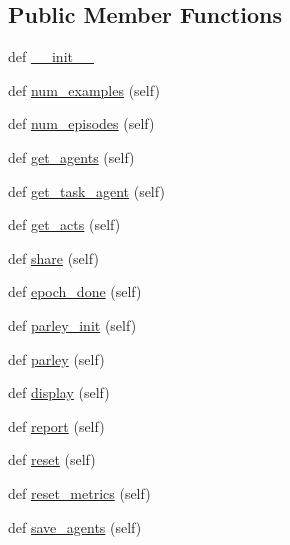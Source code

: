 \subsection*{Public Member Functions}
\begin{DoxyCompactItemize}
\item 
def \hyperlink{classparlai_1_1core_1_1worlds_1_1MultiWorld_aba482213da390b05a216cedb070e28ee}{\+\_\+\+\_\+init\+\_\+\+\_\+}
\item 
def \hyperlink{classparlai_1_1core_1_1worlds_1_1MultiWorld_ae62ad8500e4208ed99ffcf91707746e1}{num\+\_\+examples} (self)
\item 
def \hyperlink{classparlai_1_1core_1_1worlds_1_1MultiWorld_a3efde7408bd94052b0a4880aefbc5d0a}{num\+\_\+episodes} (self)
\item 
def \hyperlink{classparlai_1_1core_1_1worlds_1_1MultiWorld_a6e012b3db760d95f189baf3466fc55d0}{get\+\_\+agents} (self)
\item 
def \hyperlink{classparlai_1_1core_1_1worlds_1_1MultiWorld_a593c1eb833633014c2506abd80695317}{get\+\_\+task\+\_\+agent} (self)
\item 
def \hyperlink{classparlai_1_1core_1_1worlds_1_1MultiWorld_a73074f333544de25b4e07ffc48819896}{get\+\_\+acts} (self)
\item 
def \hyperlink{classparlai_1_1core_1_1worlds_1_1MultiWorld_ae780a8cfd7c6b675727cca24b8321015}{share} (self)
\item 
def \hyperlink{classparlai_1_1core_1_1worlds_1_1MultiWorld_a7034326fa264402e0857a98d1ec688de}{epoch\+\_\+done} (self)
\item 
def \hyperlink{classparlai_1_1core_1_1worlds_1_1MultiWorld_a9f2f4de7791e3b295359039e9d26a523}{parley\+\_\+init} (self)
\item 
def \hyperlink{classparlai_1_1core_1_1worlds_1_1MultiWorld_aae71b8182e17a1579352a52b56614b64}{parley} (self)
\item 
def \hyperlink{classparlai_1_1core_1_1worlds_1_1MultiWorld_a03a162a9c53ed806221e46762d3fcb52}{display} (self)
\item 
def \hyperlink{classparlai_1_1core_1_1worlds_1_1MultiWorld_aa89365baa3672e08d8e239199df4eda7}{report} (self)
\item 
def \hyperlink{classparlai_1_1core_1_1worlds_1_1MultiWorld_afcdadb92455ce41a8156390d876ebb96}{reset} (self)
\item 
def \hyperlink{classparlai_1_1core_1_1worlds_1_1MultiWorld_a7d52dd60bfa5654bfc4ad656ccb07fa1}{reset\+\_\+metrics} (self)
\item 
def \hyperlink{classparlai_1_1core_1_1worlds_1_1MultiWorld_a4d72a950f8aae3d248a9694908f0fc85}{save\+\_\+agents} (self)
\end{DoxyCompactItemize}
